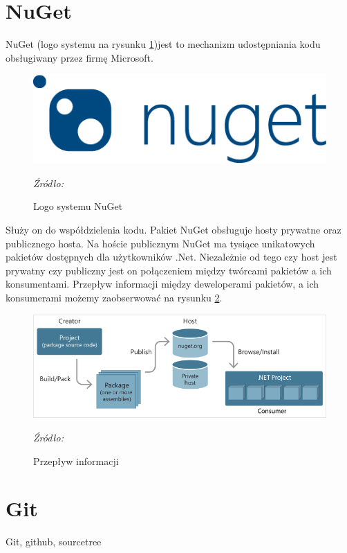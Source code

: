\documentclass[12pt,oneside]{report}
\begin{document}
\section{NuGet}
NuGet (logo systemu na rysunku \ref{nugetLogo})jest to mechanizm udostępniania kodu obsługiwany przez firmę Microsoft. 
\begin{figure}[H]
	\centering
	\includegraphics[scale=0.25]{nugetLogo}
	\caption{Logo systemu NuGet}
	\textit{Źródło: \cite{Nuget}}
	\label{nugetLogo}
\end{figure}
Służy on do współdzielenia kodu. Pakiet NuGet obsługuje hosty prywatne oraz publicznego hosta. Na hoście publicznym NuGet ma tysiące unikatowych pakietów dostępnych dla użytkowników .Net. Niezależnie od tego czy host jest prywatny czy publiczny jest on połączeniem między twórcami pakietów a ich konsumentami. Przepływ informacji między deweloperami pakietów, a ich konsumerami możemy zaobserwować na rysunku \ref{NugetFlow}.
\begin{figure}[H]
	\centering
	\includegraphics[scale=0.75]{nugetFlow}
	\caption{Przepływ informacji}
	\textit{Źródło: \cite{Nuget}}
	\label{NugetFlow}
\end{figure}
\section{Git}
Git, github, sourcetree
\end{document}
